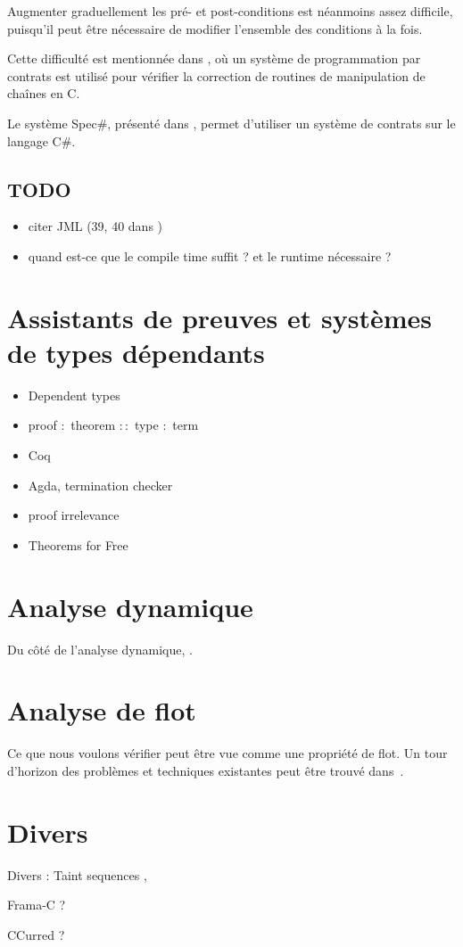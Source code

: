 Augmenter graduellement les pré- et post-conditions est néanmoins assez
difficile, puisqu'il peut être nécessaire de modifier l'ensemble des conditions
à la fois.

Cette difficulté est mentionnée dans \cite{cssv}, où un système de programmation
par contrats est utilisé pour vérifier la correction de routines de manipulation
de chaînes en C.

Le système Spec\#, présenté dans \cite{krml136}, permet d'utiliser un système de
contrats sur le langage C\#.

\subsection*{TODO}

\begin{itemize}
\item
  citer JML (39, 40 dans \cite{krml136})
\item
  quand est-ce que le compile time suffit ? et le runtime nécessaire ?
\end{itemize}

\section{Assistants de preuves et systèmes de types dépendants}

\begin{itemize}
\item Dependent types
\item proof $:$ theorem $::$ type $:$ term
\item Coq
\item Agda, termination checker
\item proof irrelevance
\item Theorems for Free\cite{theoremsforfree}
\end{itemize}


\section{Analyse dynamique}

Du côté de l'analyse dynamique, \cite{oakland10}.

\section{Analyse de flot}

Ce que nous voulons vérifier peut être vue comme une propriété de flot. Un tour
d'horizon des problèmes et techniques existantes peut être trouvé
dans~\cite{sm-jsac03}.

\section{Divers}

Divers : Taint sequences \cite{mdv10},

Frama-C ?

CCurred ?
